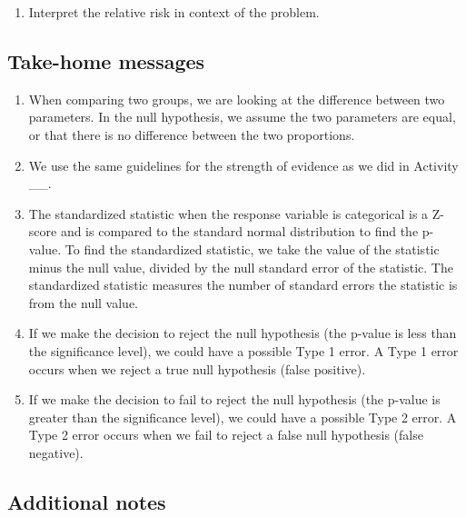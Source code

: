 \documentclass[
]{report}
\providecommand{\tightlist}{%
  \setlength{\itemsep}{0pt}\setlength{\parskip}{0pt}}
\begin{document}
\vspace{.8in}

\begin{enumerate}
\def\labelenumi{\arabic{enumi}.}
\setcounter{enumi}{11}
\tightlist
\item
  Interpret the relative risk in context of the problem.
\end{enumerate}

\vspace{1in}

\hypertarget{take-home-messages-15}{%
\subsection{Take-home messages}\label{take-home-messages-15}}

\begin{enumerate}
\def\labelenumi{\arabic{enumi}.}
\item
  When comparing two groups, we are looking at the difference between two parameters. In the null hypothesis, we assume the two parameters are equal, or that there is no difference between the two proportions.
\item
  We use the same guidelines for the strength of evidence as we did in Activity \_\_.
\item
  The standardized statistic when the response variable is categorical is a Z-score and is compared to the standard normal distribution to find the p-value. To find the standardized statistic, we take the value of the statistic minus the null value, divided by the null standard error of the statistic. The standardized statistic measures the number of standard errors the statistic is from the null value.
\item
  If we make the decision to reject the null hypothesis (the p-value is less than the significance level), we could have a possible Type 1 error. A Type 1 error occurs when we reject a true null hypothesis (false positive).
\item
  If we make the decision to fail to reject the null hypothesis (the p-value is greater than the significance level), we could have a possible Type 2 error. A Type 2 error occurs when we fail to reject a false null hypothesis (false negative).
\end{enumerate}

\hypertarget{additional-notes-12}{%
\subsection{Additional notes}\label{additional-notes-12}}
\end{document}
